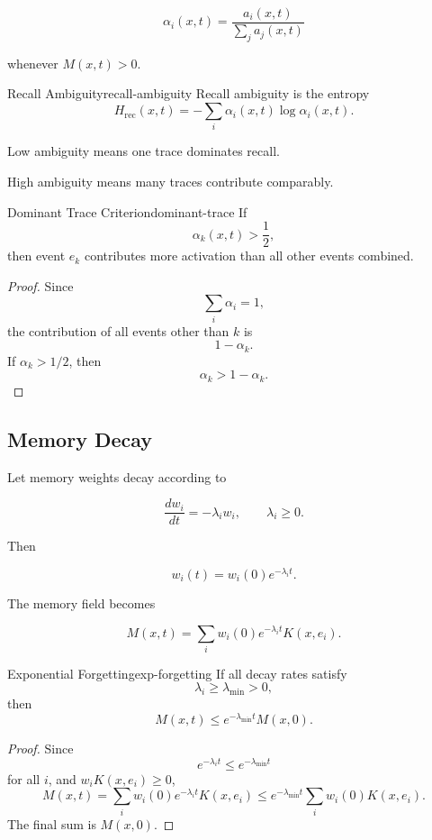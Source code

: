 \documentclass[12pt,twoside,openright]{book}
\begin{document}
\[
\alpha_i(x,t)
=
\frac{a_i(x,t)}
{\sum_j a_j(x,t)}
\]

whenever \(M(x,t)>0\).

\begin{definition}{Recall Ambiguity}{recall-ambiguity}
  Recall ambiguity is the entropy
  \[
    H_{\mathrm{rec}}(x,t)
=
-
    \sum_i
    \alpha_i(x,t)\log\alpha_i(x,t).
  \]
\end{definition}

Low ambiguity means one trace dominates recall.

High ambiguity means many traces contribute comparably.

\begin{proposition}{Dominant Trace Criterion}{dominant-trace}
  If
  \[
    \alpha_k(x,t)>\frac12,
  \]
  then event \(e_k\) contributes more activation than all
  other events combined.
\end{proposition}

\begin{proof}
  Since
  \[
    \sum_i\alpha_i=1,
  \]
  the contribution of all events other than \(k\) is
  \[
    1-\alpha_k.
  \]
  If \(\alpha_k>1/2\), then
  \[
    \alpha_k>1-\alpha_k.
  \]
\end{proof}

\subsection{Memory Decay}

Let memory weights decay according to

\[
\frac{dw_i}{dt}
=
-\lambda_i w_i,
\qquad
\lambda_i\ge0.
\]

Then

\[
w_i(t)
=
w_i(0)e^{-\lambda_i t}.
\]

The memory field becomes

\[
M(x,t)
=
\sum_i
w_i(0)e^{-\lambda_i t}K(x,e_i).
\]

\begin{theorem}{Exponential Forgetting}{exp-forgetting}
  If all decay rates satisfy
  \[
    \lambda_i\ge\lambda_{\min}>0,
  \]
  then
  \[
    M(x,t)
    \le
    e^{-\lambda_{\min}t}M(x,0).
  \]
\end{theorem}

\begin{proof}
  Since
  \[
    e^{-\lambda_i t}\le e^{-\lambda_{\min}t}
  \]
  for all \(i\), and \(w_iK(x,e_i)\ge0\),
  \[
    M(x,t)
=
    \sum_i
    w_i(0)e^{-\lambda_i t}K(x,e_i)
    \le
    e^{-\lambda_{\min}t}
    \sum_i w_i(0)K(x,e_i).
  \]
  The final sum is \(M(x,0)\).
\end{proof}
\end{document}
